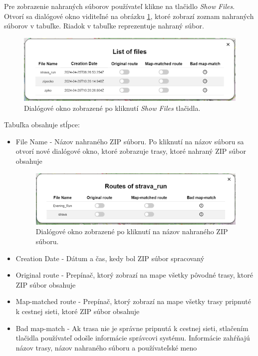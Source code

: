 Pre zobrazenie nahraných súborov používateľ klikne na tlačidlo \textit{Show Files}. Otvorí sa dialógové okno viditeľné na obrázku \ref{fig:uploaded_routes_dialog}, ktoré zobrazí zoznam nahraných súborov v tabuľke. Riadok v tabuľke reprezentuje nahraný súbor.
\begin{figure}[H]
  \centering
  \includegraphics[width=0.8 \textwidth]{img/tools-panel/uploaded-routes.png}
  \caption{Dialógové okno zobrazené po kliknutí \textit{Show Files} tlačidla.}
  \label{fig:uploaded_routes_dialog}
\end{figure}
\noindent Tabuľka obsahuje stĺpce:
\begin{itemize}
  \item File Name - Názov nahraného ZIP súboru. Po kliknutí na názov súboru sa otvorí nové dialógové okno, ktoré zobrazuje trasy, ktoré nahraný ZIP súbor obsahuje
        \begin{figure}[H]
          \centering
          \includegraphics[width=0.8 \textwidth]{img/tools-panel/routes-of-zip.png}
          \caption{Dialógové okno zobrazené po kliknutí na názov nahraného ZIP súboru.}
        \end{figure}
  \item Creation Date - Dátum a čas, kedy bol ZIP súbor spracovaný
  \item Original route - Prepínač, ktorý zobrazí na mape všetky pôvodné trasy, ktoré ZIP súbor obsahuje
  \item Map-matched route - Prepínač, ktorý zobrazí na mape všetky trasy pripnuté k cestnej sieti, ktoré ZIP súbor obsahuje
  \item Bad map-match - Ak trasa nie je správne pripnutá k cestnej sieti, stlačením tlačidla používateľ odošle informácie správcovi systému. Informácie zahŕňajú názov trasy, názov nahraného súboru a používateľské meno
\end{itemize}

